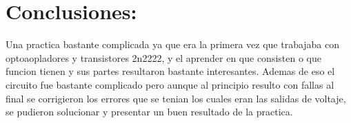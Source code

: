 \documentclass[12pt,a4paper]{article}
\begin{document}
\section{Conclusiones:}
Una practica bastante complicada ya que era la primera vez que trabajaba con optoaopladores y transistores 2n2222, y el aprender en que consisten o que funcion tienen y sus partes resultaron bastante interesantes.
Ademas de eso el circuito fue bastante complicado pero aunque al principio resulto con fallas al final se corrigieron los errores que se tenian los cuales eran las salidas de voltaje, se pudieron solucionar y presentar un buen resultado de la practica.
\end{document}
